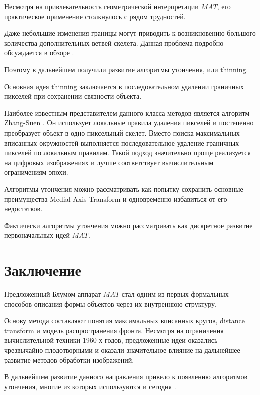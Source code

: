\documentclass[12pt,a4paper]{article}
\begin{document}
Несмотря на привлекательность геометрической интерпретации $MAT$, его практическое применение столкнулось с рядом трудностей.

Даже небольшие изменения границы могут приводить к возникновению большого количества дополнительных ветвей скелета. Данная проблема подробно обсуждается в обзоре \cite{lam1992}.

Поэтому в дальнейшем получили развитие алгоритмы утончения, или thinning.

Основная идея thinning заключается в последовательном удалении граничных пикселей при сохранении связности объекта.

Наиболее известным представителем данного класса методов является алгоритм Zhang-Suen \cite{zhangsuen1984}. Он использует локальные правила удаления пикселей и постепенно преобразует объект в одно-пиксельный скелет. Вместо поиска максимальных вписанных окружностей выполняется последовательное удаление граничных пикселей по локальным правилам. Такой подход значительно проще реализуется на цифровых изображениях и лучше соответствует вычислительным ограничениям эпохи.

Алгоритмы утончения можно рассматривать как попытку сохранить основные преимущества Medial Axis Transform и одновременно избавиться от его недостатков.

Фактически алгоритмы утончения можно рассматривать как дискретное развитие первоначальных идей $MAT$.

\section{Заключение}

Предложенный Блумом аппарат $MAT$ стал одним из первых формальных способов описания формы объектов через их внутреннюю структуру.

Основу метода составляют понятия максимальных вписанных кругов, distance transform и модель распространения фронта. Несмотря на ограничения вычислительной техники 1960-х годов, предложенные идеи оказались чрезвычайно плодотворными и оказали значительное влияние на дальнейшее развитие методов обработки изображений.

В дальнейшем развитие данного направления привело к появлению алгоритмов утончения, многие из которых используются и сегодня \cite{zhangsuen1984,lam1992}.
\end{document}
